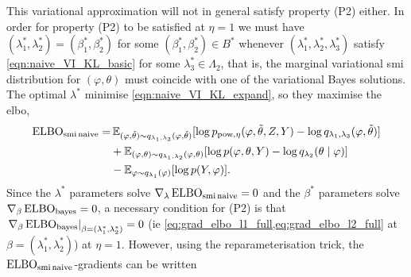 This variational approximation will not in general satisfy property (P2) either. In order for property (P2) to be satisfied at $\eta=1$ we must have $(\lambda^*_1,\lambda^*_2)=(\beta^*_1,\beta^*_2)$ for some $(\beta^*_1,\beta^*_2)\in B^*$ whenever $(\lambda^*_1,\lambda^*_2,\lambda^*_3)$ satisfy \cref{eqn:naive_VI_KL_basic} for some $\lambda^*_3\in \Lambda_2$, that is, the marginal variational \acrshort*{smi} distribution for $(\varphi,\theta)$ must coincide with one of the variational Bayes solutions. The optimal $\lambda^*$ minimise \cref{eqn:naive_VI_KL_expand}, so they maximise the \acrshort*{elbo},
\begin{align}\label{eq:elbo_naive_smi}
  \operatorname{\text{ELBO}}_{\operatorname{\text{smi}} \text{naive}} = & \operatorname{\mathbb{E}}_{(\varphi, \tilde\theta) \sim q_{\lambda_1,\lambda_3}(\varphi, \tilde\theta)}[ \log p_{\operatorname{\text{pow}}, \eta}(\varphi, \tilde\theta, Z, Y) - \log q_{\lambda_1,\lambda_3}(\varphi, \tilde\theta) ] \nonumber \\
                              & + \operatorname{\mathbb{E}}_{(\varphi, \theta) \sim q_{\lambda_1,\lambda_2}(\varphi, \theta)}[ \log p(\varphi, \theta, Y) - \log q_{\lambda_2}(\theta \mid \varphi) ]                                                       \\
                              & - \operatorname{\mathbb{E}}_{\varphi \sim q_{\lambda_1}(\varphi)}[ \log p(Y, \varphi) ]. \nonumber
\end{align}
Since the $\lambda^*$ parameters solve $\nabla_\lambda \operatorname{\text{ELBO}}_{\operatorname{\text{smi}} \text{naive}}=0$ and the $\beta^*$ parameters solve $\nabla_\beta \operatorname{\text{ELBO}}_{\operatorname{\text{bayes}}}=0$, a necessary condition for (P2) is that
$\left.\nabla_\beta \operatorname{\text{ELBO}}_{\operatorname{\text{bayes}}}\right\vert_{\beta=(\lambda^*_1,\lambda^*_2)}=0$
(ie \cref{eq:grad_elbo_l1_full,eq:grad_elbo_l2_full} at $\beta=(\lambda^*_1,\lambda^*_2)$) at $\eta=1$.
However, using the reparameterisation trick, the $\operatorname{\text{ELBO}}_{\operatorname{\text{smi}} \text{naive}}$-gradients can be written
